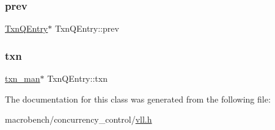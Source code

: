 \subsubsection{\texorpdfstring{prev}{prev}}
{\footnotesize\ttfamily \hyperlink{classTxnQEntry}{Txn\+Q\+Entry}$\ast$ Txn\+Q\+Entry\+::prev}

\mbox{\label{classTxnQEntry_af5555a63ea5cde53096ac40f14ae4071}} 
\subsubsection{\texorpdfstring{txn}{txn}}
{\footnotesize\ttfamily \hyperlink{classtxn__man}{txn\+\_\+man}$\ast$ Txn\+Q\+Entry\+::txn}



The documentation for this class was generated from the following file\+:\begin{DoxyCompactItemize}
\item 
macrobench/concurrency\+\_\+control/\hyperlink{vll_8h}{vll.\+h}\end{DoxyCompactItemize}
